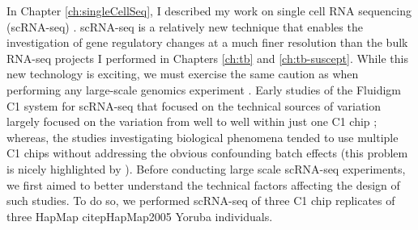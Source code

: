 In Chapter \ref{ch:singleCellSeq}, I described my work on single cell
RNA sequencing (scRNA-seq) \citep{Tung2016}. scRNA-seq is a relatively
new technique \citep{Liang2014, Macaulay2014, Saliba2014, Grun2015, Stegle2015, Bacher2016}
that enables the investigation of gene regulatory
changes at a much finer resolution than the bulk RNA-seq projects I
performed in Chapters \ref{ch:tb} and \ref{ch:tb-suscept}. While this
new technology is exciting, we must exercise the same caution as when
performing any large-scale genomics experiment \citep{Auer2010}. Early studies of the
Fluidigm C1 system for scRNA-seq that focused on the technical sources
of variation largely focused on the variation from well to well within
just one C1 chip \citep{Brennecke2013, Grun2014, Islam2014, Ding2015, Vallejos2015}
; whereas, the studies investigating biological
phenomena tended to use multiple C1 chips without addressing the
obvious confounding batch effects (this problem is nicely highlighted
by \citep{Hicks2015}). Before conducting large scale scRNA-seq
experiments, we first aimed to better understand the technical factors
affecting the design of such studies. To do so, we performed scRNA-seq
of three C1 chip replicates of three HapMap citep{HapMap2005} Yoruba individuals.

